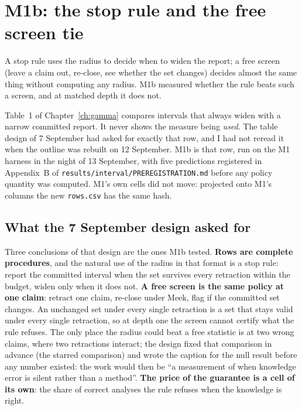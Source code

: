 \chapter{M1b: the stop rule and the free screen tie}\label{ch:m1b}

\begin{ideia}
A stop rule uses the radius to decide when to widen the report; a free screen (leave a claim out,
re-close, see whether the set changes) decides almost the same thing without computing any radius.
M1b measured whether the rule beats such a screen, and at matched depth it does not.
\end{ideia}

Table~1 of Chapter~\ref{ch:gamma} compares intervals that always widen with a narrow committed
report. It never shows the measure being \emph{used}. The table design of 7 September had asked for
exactly that row, and I had not reread it when the outline was rebuilt on 12 September. M1b is that
row, run on the M1 harness in the night of 13 September, with five predictions registered in
Appendix~B of \texttt{results/interval/PREREGISTRATION.md} before any policy quantity was computed.
M1's own cells did not move: projected onto M1's columns the new \texttt{rows.csv} has the same hash.

\begin{antes}
\end{antes}

\section{What the 7 September design asked for}

Three conclusions of that design are the ones M1b tested. \textbf{Rows are complete procedures}, and
the natural use of the radius in that format is a stop rule: report the committed interval
when the set survives every retraction within the budget, widen only when it does not. \textbf{A free
screen is the same policy at one claim}: retract one claim, re-close under Meek, flag if the committed
set changes. An unchanged set under every single retraction is a set that stays valid under every
single retraction, so at depth one the screen cannot certify what the rule refuses. The only place
the radius could beat a free statistic is at two wrong claims, where two retractions interact; the
design fixed that comparison in advance (the starred comparison) and wrote the caption for the
null result before any number existed: the work would then be ``a measurement of when knowledge
error is silent rather than a method''. \textbf{The price of the guarantee is a cell of its own}: the
share of correct analyses the rule refuses when the knowledge is right.

